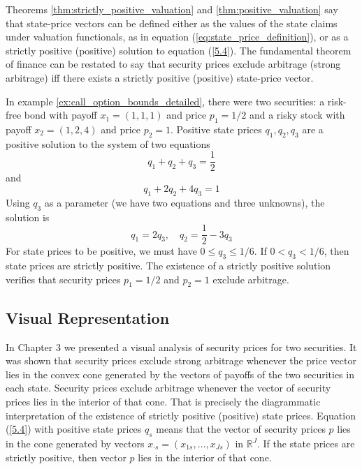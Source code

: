 \documentclass[\topdir/lecture\_notes.tex]{subfiles}
\begin{document}
Theorems \ref{thm:strictly_positive_valuation} and \ref{thm:positive_valuation} say that state-price vectors can be defined either as the values of the state claims under valuation functionals, as in equation (\ref{eq:state_price_definition}), or as a strictly positive (positive) solution to equation (\ref{5.4}). The fundamental theorem of finance can be restated to say that security prices exclude arbitrage (strong arbitrage) iff there exists a strictly positive (positive) state-price vector.
\begin{example}\label{ex:bond_stock_state_prices} 
In example \ref{ex:call_option_bounds_detailed}, there were two securities: a risk-free bond with payoff \(x_{1}=(1,1,1)\) and price \(p_{1}=1 / 2\) and a risky stock with payoff \(x_{2}=(1,2,4)\) and price \(p_{2}=1\). Positive state prices \(q_{1}, q_{2}, q_{3}\) are a positive solution to the system of two equations
\begin{equation*}
q_{1}+q_{2}+q_{3}=\frac{1}{2} 
\end{equation*}
and
\begin{equation*}
q_{1}+2 q_{2}+4 q_{3}=1 
\end{equation*}
Using \(q_{3}\) as a parameter (we have two equations and three unknowns), the solution is
\begin{equation*}
q_{1}=2 q_{3}, \quad q_{2}=\frac{1}{2}-3 q_{3} 
\end{equation*}
For state prices to be positive, we must have \(0 \leq q_{3} \leq 1 / 6\). If \(0<q_{3}<1 / 6\), then state prices are strictly positive. The existence of a strictly positive solution verifies that security prices \(p_{1}=1 / 2\) and \(p_{2}=1\) exclude arbitrage.
\end{example}

\subsection{Visual Representation}
In Chapter 3 we presented a visual analysis of security prices for two securities. It was shown that security prices exclude strong arbitrage whenever the price vector lies in the convex cone generated by the vectors of payoffs of the two securities in each state. Security prices exclude arbitrage whenever the vector of security prices lies in the interior of that cone. That is precisely the diagrammatic interpretation of the existence of strictly positive (positive) state prices. Equation (\ref{5.4}) with positive state prices \(q_{s}\) means that the vector of security prices \(p\) lies in the cone generated by vectors \(x_{\cdot s}=\left(x_{1 s}, \ldots, x_{J s}\right)\) in \(\mathbb{R}^{J}\). If the state prices are strictly positive, then vector \(p\) lies in the interior of that cone.
\end{document}
